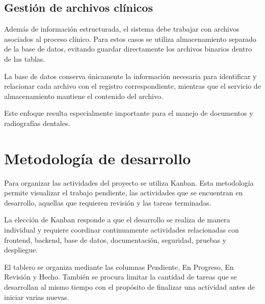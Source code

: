 \subsection{Gestión de archivos clínicos}

Además de información estructurada, el sistema debe trabajar con archivos
asociados al proceso clínico. Para estos casos se utiliza almacenamiento
separado de la base de datos, evitando guardar directamente los archivos
binarios dentro de las tablas.

La base de datos conserva únicamente la información necesaria para
identificar y relacionar cada archivo con el registro correspondiente,
mientras que el servicio de almacenamiento mantiene el contenido del
archivo.

Este enfoque resulta especialmente importante para el manejo de documentos
y radiografías dentales.



\section{Metodología de desarrollo}

Para organizar las actividades del proyecto se utiliza Kanban. Esta
metodología permite visualizar el trabajo pendiente, las actividades que
se encuentran en desarrollo, aquellas que requieren revisión y las tareas
terminadas.

La elección de Kanban responde a que el desarrollo se realiza de manera
individual y requiere coordinar continuamente actividades relacionadas con
frontend, backend, base de datos, documentación, seguridad, pruebas y
despliegue.

El tablero se organiza mediante las columnas Pendiente, En Progreso,
En Revisión y Hecho. También se procura limitar la cantidad de tareas que
se desarrollan al mismo tiempo con el propósito de finalizar una actividad
antes de iniciar varias nuevas.

